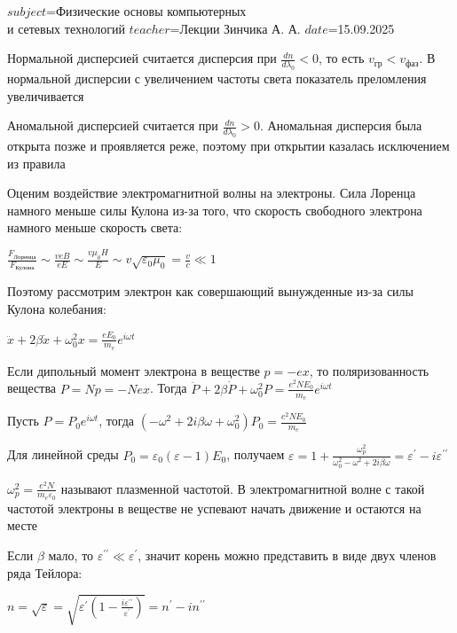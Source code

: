 $subject$=Физические основы компьютерных \\ и сетевых технологий
$teacher$=Лекции Зинчика А. А.
$date$=15.09.2025

Нормальной дисперсией считается дисперсия при $\frac{dn}{d\lambda_0} < 0$, то есть $v_{\text{гр}} < v_{\text{фаз}}$. В нормальной дисперсии с увеличением частоты света показатель преломления увеличивается

Аномальной дисперсией считается при $\frac{dn}{d\lambda_0} > 0$. Аномальная дисперсия была открыта позже и проявляется реже, поэтому при открытии казалась исключением из правила

\mediumvspace

Оценим воздействие электромагнитной волны на электроны. Сила Лоренца намного меньше силы Кулона из-за того, что скорость свободного электрона намного меньше скорость света:

$\frac{F_{\text{Лоренца}}}{F_{\text{Кулона}}} \sim \frac{v e B}{e E} \sim \frac{v \mu_0 H}{E} \sim v \sqrt{\varepsilon_0 \mu_0} = \frac{v}{c} \ll 1$

Поэтому рассмотрим электрон как совершающий вынужденные из-за силы Кулона колебания:

$\ddot x + 2 \beta \dot x + \omega_0^2 x = \frac{e E_0}{m_e} e^{i \omega t}$

Если дипольный момент электрона в веществе $p = -ex$, то поляризованность вещества $P = Np = -Nex$. Тогда $\ddot P + 2 \beta \dot P + \omega^2_0 P = \frac{e^2 N E_0}{m_e} e^{i \omega t}$

Пусть $P = P_0 e^{i \omega t}$, тогда $(-\omega^2 + 2 i \beta \omega + \omega_0^2) P_0 = \frac{e^2 N E_0}{m_e}$

Для линейной среды $P_0 = \varepsilon_0 (\varepsilon - 1) E_0$, получаем $\varepsilon = 1 + \frac{\omega_p^2}{\omega_0^2 - \omega^2 + 2i\beta \omega} = \varepsilon^{\prime} - i \varepsilon^{\prime\prime}$

$\omega_p^2 = \frac{e^2 N}{m_e \varepsilon_0}$ называют плазменной частотой. В электромагнитной волне с такой частотой электроны в веществе не успевают начать движение и остаются на месте

Если $\beta$ мало, то $\varepsilon^{\prime\prime} \ll \varepsilon^{\prime}$, значит корень можно представить в виде двух членов ряда Тейлора:

$n = \sqrt{\varepsilon} = \sqrt{\varepsilon^{\prime} \left(1 - \frac{i \varepsilon^{\prime\prime}}{\varepsilon^{\prime}}\right)} = n^{\prime} - i n^{\prime\prime}$

